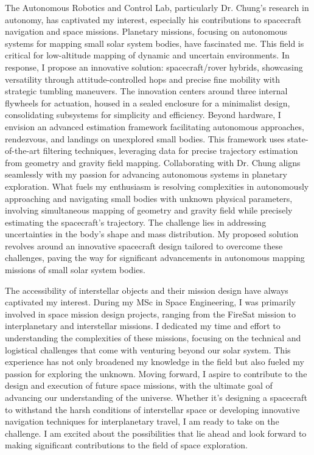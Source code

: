 \documentclass[a4,20pt]{article}
\begin{document}
\begin{large}
The Autonomous Robotics and Control Lab, particularly Dr. Chung's research in autonomy, has captivated my interest, especially his contributions to spacecraft navigation and space missions. Planetary missions, focusing on autonomous systems for mapping small solar system bodies, have fascinated me. This field is critical for low-altitude mapping of dynamic and uncertain environments. In response, I propose an innovative solution: spacecraft/rover hybrids, showcasing versatility through attitude-controlled hops and precise fine mobility with strategic tumbling maneuvers. The innovation centers around three internal flywheels for actuation, housed in a sealed enclosure for a minimalist design, consolidating subsystems for simplicity and efficiency. Beyond hardware, I envision an advanced estimation framework facilitating autonomous approaches, rendezvous, and landings on unexplored small bodies. This framework uses state-of-the-art filtering techniques, leveraging data for precise trajectory estimation from geometry and gravity field mapping. Collaborating with Dr. Chung aligns seamlessly with my passion for advancing autonomous systems in planetary exploration. What fuels my enthusiasm is resolving complexities in autonomously approaching and navigating small bodies with unknown physical parameters, involving simultaneous mapping of geometry and gravity field while precisely estimating the spacecraft's trajectory. The challenge lies in addressing uncertainties in the body's shape and mass distribution. My proposed solution revolves around an innovative spacecraft design tailored to overcome these challenges, paving the way for significant advancements in autonomous mapping missions of small solar system bodies.

The accessibility of interstellar objects and their mission design have always captivated my interest. During my MSc in Space Engineering, I was primarily involved in space mission design projects, ranging from the FireSat mission to interplanetary and interstellar missions. I dedicated my time and effort to understanding the complexities of these missions, focusing on the technical and logistical challenges that come with venturing beyond our solar system. This experience has not only broadened my knowledge in the field but also fueled my passion for exploring the unknown. Moving forward, I aspire to contribute to the design and execution of future space missions, with the ultimate goal of advancing our understanding of the universe. Whether it's designing a spacecraft to withstand the harsh conditions of interstellar space or developing innovative navigation techniques for interplanetary travel, I am ready to take on the challenge. I am excited about the possibilities that lie ahead and look forward to making significant contributions to the field of space exploration.







\end{large}
\end{document}
